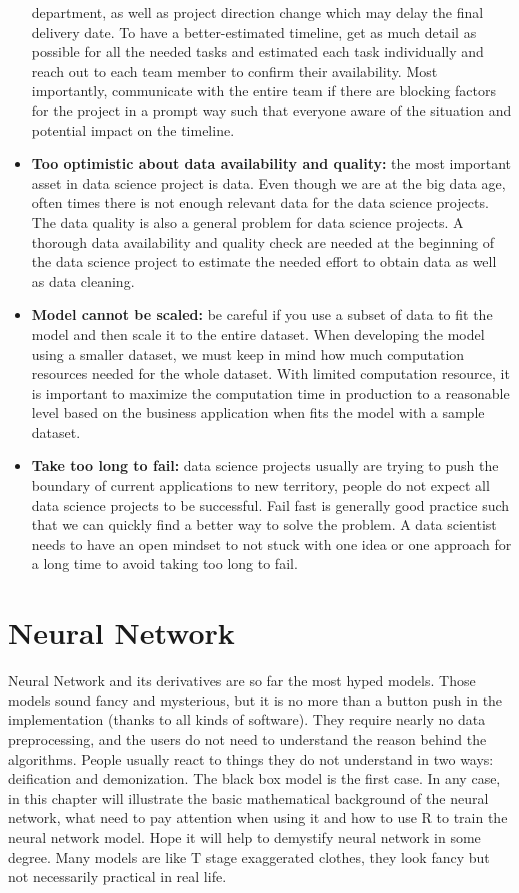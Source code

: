 \documentclass[]{book}
\theoremstyle{definition}
\theoremstyle{definition}
\theoremstyle{remark}
\begin{document}
\begin{itemize}
  department, as well as project direction change which may delay the
  final delivery date. To have a better-estimated timeline, get as much
  detail as possible for all the needed tasks and estimated each task
  individually and reach out to each team member to confirm their
  availability. Most importantly, communicate with the entire team if
  there are blocking factors for the project in a prompt way such that
  everyone aware of the situation and potential impact on the timeline.
\item
  \textbf{Too optimistic about data availability and quality:} the most
  important asset in data science project is data. Even though we are at
  the big data age, often times there is not enough relevant data for
  the data science projects. The data quality is also a general problem
  for data science projects. A thorough data availability and quality
  check are needed at the beginning of the data science project to
  estimate the needed effort to obtain data as well as data cleaning.
\item
  \textbf{Model cannot be scaled:} be careful if you use a subset of
  data to fit the model and then scale it to the entire dataset. When
  developing the model using a smaller dataset, we must keep in mind how
  much computation resources needed for the whole dataset. With limited
  computation resource, it is important to maximize the computation time
  in production to a reasonable level based on the business application
  when fits the model with a sample dataset.
\item
  \textbf{Take too long to fail:} data science projects usually are
  trying to push the boundary of current applications to new territory,
  people do not expect all data science projects to be successful. Fail
  fast is generally good practice such that we can quickly find a better
  way to solve the problem. A data scientist needs to have an open
  mindset to not stuck with one idea or one approach for a long time to
  avoid taking too long to fail.
\end{itemize}

\chapter{Neural Network}\label{neural-network}

Neural Network and its derivatives are so far the most hyped models.
Those models sound fancy and mysterious, but it is no more than a button
push in the implementation (thanks to all kinds of software). They
require nearly no data preprocessing, and the users do not need to
understand the reason behind the algorithms. People usually react to
things they do not understand in two ways: deification and demonization.
The black box model is the first case. In any case, in this chapter will
illustrate the basic mathematical background of the neural network, what
need to pay attention when using it and how to use R to train the neural
network model. Hope it will help to demystify neural network in some
degree. Many models are like T stage exaggerated clothes, they look
fancy but not necessarily practical in real life.
\end{document}
